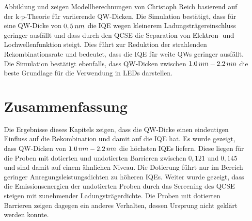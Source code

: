 \noindent 
% 
Abbildung und zeigen Modellberechnungen von Christoph Reich basierend auf der k$\cdot$p-Theorie für variierende QW-Dicken. Die Simulation bestätigt, dass für eine QW-Dicke von $0,5 \thinspace nm$ die IQE wegen kleinerem Ladungsträgereinschluss geringer ausfällt und dass durch den QCSE die Separation von Elektron- und Lochwellenfunktion steigt. Dies führt zur Reduktion der strahlenden Rekombinationsrate und bedeutet, dass die IQE für weite QWs geringer ausfällt. Die Simulation bestätigt ebenfalls, dass QW-Dicken zwischen $1.0 \thinspace nm- 2.2 \thinspace nm$ die beste Grundlage für die Verwendung in LEDs darstellen.

\section{Zusammenfassung}

Die Ergebnisse dieses Kapitels zeigen, dass die QW-Dicke einen eindeutigen Einfluss auf die Rekombination und damit auf die IQE hat. Es wurde gezeigt, dass QW-Dicken von $1.0 \thinspace nm- 2.2 \thinspace nm$ die höchsten IQEs liefern. Diese liegen für die Proben mit dotierten und undotierten Barrieren zwischen $0,121$ und $0,145$ und sind damit auf einem ähnlichen Niveau. Die Dotierung führt nur im Bereich geringer Anregungsleistungsdichten zu höheren IQEs. Weiter wurde gezeigt, dass die Emissionsenergien der undotierten Proben durch das Screening des QCSE steigen mit zunehmender Ladungsträgerdichte. Die Proben mit dotierten Barrieren zeigen dagegen ein anderes Verhalten, dessen Ursprung nicht geklärt werden konnte.   